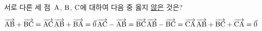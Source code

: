 서로 다른 세 점~$\mathrm{A}$, $\mathrm{B}$, $\mathrm{C}$에 대하여 다음 중 옳지 \underline{않은} 것은?
\begin{choicesii}{$\overrightarrow{\mathrm{AB}}+\overrightarrow{\mathrm{BC}}=\overrightarrow{\mathrm{AC}}$}{$\overrightarrow{\mathrm{AB}}+\overrightarrow{\mathrm{BA}}=\vec{0}$}{$\overrightarrow{\mathrm{AC}}-\overrightarrow{\mathrm{AB}}=\overrightarrow{\mathrm{BC}}$}{$\overrightarrow{\mathrm{AB}}-\overrightarrow{\mathrm{BC}}=\overrightarrow{\mathrm{CA}}$}{$\overrightarrow{\mathrm{AB}}+\overrightarrow{\mathrm{BC}}+\overrightarrow{\mathrm{CA}}=\vec{0}$}\end{choicesii}
